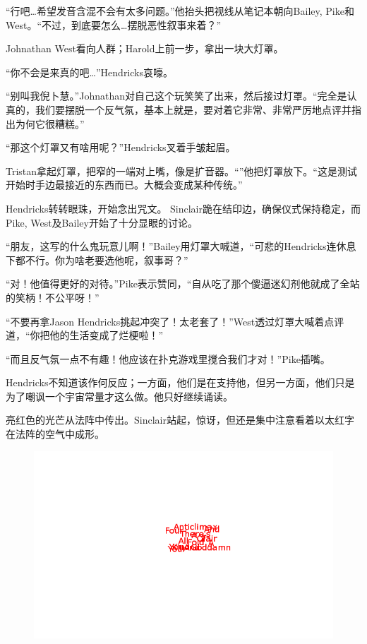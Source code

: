 “行吧…希望发音含混不会有太多问题。”他抬头把视线从笔记本朝向Bailey, Pike和West。“不过，到底要怎么…摆脱恶性叙事来着？”

Johnathan West看向人群；Harold上前一步，拿出一块大灯罩。

“你不会是来真的吧…”Hendricks哀嚎。

“别叫我倪卜慧。”Johnathan对自己这个玩笑笑了出来，然后接过灯罩。“完全是认真的，我们要摆脱一个反气氛，基本上就是，要对着它非常、非常严厉地点评并指出为何它很糟糕。”

“那这个灯罩又有啥用呢？”Hendricks叉着手皱起眉。

Tristan拿起灯罩，把窄的一端对上嘴，像是扩音器。“”他把灯罩放下。“这是测试开始时手边最接近的东西而已。大概会变成某种传统。”

Hendricks转转眼珠，开始念出咒文。 Sinclair跪在结印边，确保仪式保持稳定，而 Pike, West及Bailey开始了十分显眼的讨论。

“朋友，这写的什么鬼玩意儿啊！”Bailey用灯罩大喊道，“可悲的Hendricks连休息下都不行。你为啥老要选他呢，叙事哥？”

“对！他值得更好的对待。”Pike表示赞同，“自从吃了那个傻逼迷幻剂他就成了全站的笑柄！不公平呀！”

“不要再拿Jason Hendricks挑起冲突了！太老套了！”West透过灯罩大喊着点评道，“你把他的生活变成了烂梗啦！”

“而且反气氛一点不有趣！他应该在扑克游戏里搅合我们才对！”Pike插嘴。

Hendricks不知道该作何反应；一方面，他们是在支持他，但另一方面，他们只是为了嘲讽一个宇宙常量才这么做。他只好继续诵读。

亮红色的光芒从法阵中传出。Sinclair站起，惊讶，但还是集中注意看着以太红字在法阵的空气中成形。

\begin{figure}[H]
    \centering
    \includegraphics[width=0.8\linewidth]{images/SCP-001-story-of-your-life.png}
\end{figure}

